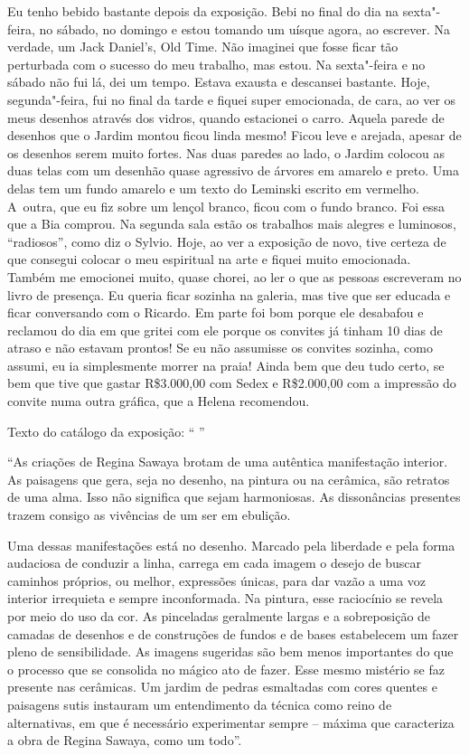 Eu tenho bebido bastante depois da exposição. Bebi no final do dia na
sexta"-feira, no sábado, no domingo e estou tomando um uísque agora, ao
escrever. Na verdade, um Jack Daniel's, Old Time. Não imaginei que fosse
ficar tão perturbada com o sucesso do meu trabalho, mas estou. Na
sexta"-feira e no sábado não fui lá, dei um tempo. Estava exausta e
descansei bastante. Hoje, segunda"-feira, fui no final da tarde e fiquei
super emocionada, de cara, ao ver os meus desenhos através dos vidros,
quando estacionei o carro. Aquela parede de desenhos que o Jardim montou
ficou linda mesmo! Ficou leve e arejada, apesar de os desenhos serem
muito fortes. Nas duas paredes ao lado, o Jardim colocou as duas telas
com um desenhão quase agressivo de árvores em amarelo e preto. Uma delas
tem um fundo amarelo e um texto do Leminski escrito em vermelho. A~outra, que eu fiz sobre um lençol branco, ficou com o fundo branco. Foi
essa que a Bia comprou. Na segunda sala estão os trabalhos mais alegres
e luminosos, ``radiosos'', como diz o Sylvio. Hoje, ao ver a exposição
de novo, tive certeza de que consegui colocar o meu espiritual na arte e
fiquei muito emocionada. Também me emocionei muito, quase chorei, ao ler
o que as pessoas escreveram no livro de presença. Eu queria ficar
sozinha na galeria, mas tive que ser educada e ficar conversando com o
Ricardo. Em parte foi bom porque ele desabafou e reclamou do dia em que
gritei com ele porque os convites já tinham 10 dias de atraso e não
estavam prontos! Se eu não assumisse os convites sozinha, como assumi,
eu ia simplesmente morrer na praia! Ainda bem que deu tudo certo, se bem
que tive que gastar R\$3.000,00 com Sedex e R\$2.000,00 com a impressão
do convite numa outra gráfica, que a Helena recomendou.

Texto do catálogo da exposição: `` ''

``As criações de Regina Sawaya brotam de uma autêntica manifestação
interior. As paisagens que gera, seja no desenho, na pintura ou na
cerâmica, são retratos de uma alma. Isso não significa que sejam
harmoniosas. As dissonâncias presentes trazem consigo as vivências de um
ser em ebulição.

Uma dessas manifestações está no desenho. Marcado pela liberdade e pela
forma audaciosa de conduzir a linha, carrega em cada imagem o desejo de
buscar caminhos próprios, ou melhor, expressões únicas, para dar vazão a
uma voz interior irrequieta e sempre inconformada. Na pintura, esse
raciocínio se revela por meio do uso da cor. As pinceladas geralmente
largas e a sobreposição de camadas de desenhos e de construções de
fundos e de bases estabelecem um fazer pleno de sensibilidade. As
imagens sugeridas são bem menos importantes do que o processo que se
consolida no mágico ato de fazer. Esse mesmo mistério se faz presente
nas cerâmicas. Um jardim de pedras esmaltadas com cores quentes e
paisagens sutis instauram um entendimento da técnica como reino de
alternativas, em que é necessário experimentar sempre -- máxima que
caracteriza a obra de Regina Sawaya, como um todo''.

